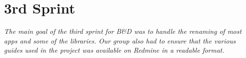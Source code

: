 \chapter{3rd Sprint} \label{ChapSprint3}
\textit{The main goal of the third sprint for B\&D was to handle the renaming of most apps and some of the libraries. Our group also had to ensure that the various guides used in the project was available on Redmine in a readable format.}





